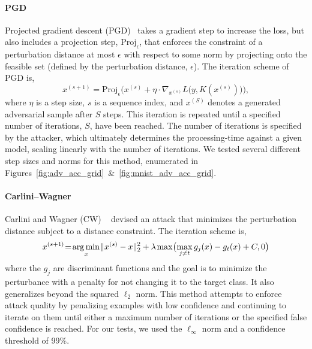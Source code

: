 \documentclass[lettersize,journal]{IEEEtran}
\DeclareMathOperator*{\argmin}{arg\,min}
\begin{document}
\paragraph{PGD}

Projected gradient descent (PGD)~\cite{carlini_towards_2017} takes a gradient step to increase the loss, but also includes a projection step, $\mathrm{Proj}_\epsilon$, that enforces the constraint of a perturbation distance at most $\epsilon$ with respect to some norm
by projecting onto the feasible set (defined by the perturbation distance, $\epsilon$). The iteration scheme of PGD is,
$$
    x^{(s+1)} = \mathrm{Proj}_\epsilon \Big( x^{(s)} + \eta \cdot \nabla_{x^{(s)}} L\big(y, K(x^{(s)})\big) \Big),
$$
where $\eta$ is a step size, $s$ is a sequence index, and $x^{(S)}$ denotes a generated adversarial sample after $S$ steps. This iteration is repeated until a specified number of iterations, $S$, have been reached. The number of iterations is specified by the attacker, which ultimately determines the processing-time against a given model, scaling linearly with the number of iterations. We tested several different step sizes and norms for this method, enumerated in Figures~\ref{fig:adv_acc_grid}~\&~\ref{fig:mnist_adv_acc_grid}.

\paragraph{Carlini--Wagner}

Carlini and Wagner (CW) ~\cite{carlini_towards_2017} devised an attack that minimizes the perturbation distance subject to a distance constraint.
The iteration scheme is,
$$
    x^{(s+1\hspace{-0.025em})}\hspace{-0.2em}=\hspace{-0.15em}\argmin_x \hspace{-0.1em} \|x^{(s)} - x\|_2^2 + \lambda \hspace{-0.05em} \max\hspace{-0.15em}\big(\hspace{-0.15em}\max_{j\neq t} g_j(x) - g_t(x) + C, 0\big)
$$
where the $g_j$ are discriminant functions and the goal is to minimize the perturbance with a penalty for not changing it to the target class. It also generalizes beyond the squared $\ell_2$ norm. This method attempts to enforce attack quality by penalizing examples with low confidence and continuing to iterate on them until either a maximum number of iterations or the specified false confidence is reached. For our tests, we used the $\ell_{\infty}$ norm and a confidence threshold of 99\%.
\end{document}
